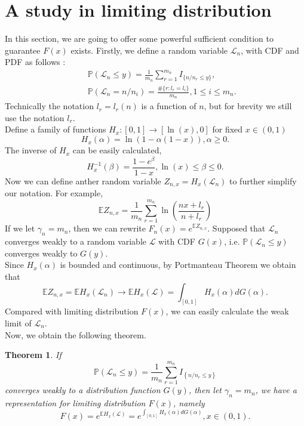 \documentclass[12pt]{article}
\theoremstyle{plain}
\newtheorem{thm}{\textbf{Theorem}}
\theoremstyle{definition}
\theoremstyle{remark}
\begin{document}
\section{A study in limiting distribution}\label{sec: a study in gamma}
In this section, we are going to offer some powerful sufficient condition to guarantee $F(x)$ exists.
Firstly, we define a random variable $\mathscr{L}_n$, with CDF and PDF as follows :
\begin{eqnarray*}
    &&\mathbb{P}(\mathscr{L}_n \leq y )=\frac{1}{m_n}\sum_{r=1}^{m_n}I_{\{n/n_r\leq y\}},\\
    &&\mathbb{P}(\mathscr{L}_n = n/n_i )=\frac{\#\{r:l_r=l_i\}}{m_n},1\leq i\leq m_n.
\end{eqnarray*}
Technically the notation $l_r=l_r(n)$ is a function of $n$, but for brevity we still use the notation $l_r$.\\
Define a family of functions $H_x:[0,1]\rightarrow[\ln (x),0]$ for fixed $x\in (0,1)$
\begin{equation*}
    H_{x}(\alpha)=\ln(1-\alpha (1-x)),\alpha \geq 0.
\end{equation*}
The inverse of $H_{x}$ can be easily calculated,
\begin{equation*}
    H^{-1}_{x}(\beta)=\dfrac{1-e^ \beta}{1-x} ,\ln(x)\leq \beta\leq0.
\end{equation*}
Now we can define anther random variable $Z_{n,x}=H_{x}(\mathscr{L}_n)$ to further simplify our notation. For example,
\begin{equation*}
    \mathbb {E}Z_{n,x}=\frac{1}{m_n} \sum_{r=1}^{m_n} \ln \left(\frac{n x+l_{r}}{n+l_{r}}\right)
\end{equation*}
If we let $\gamma_{n}=m_n$, then we can rewrite $F_n(x)=e^{\mathbb{E}Z_{n,x}}$.
Supposed that $\mathscr{L}_n$ converges weakly to a random variable $\mathscr{L}$ with CDF $G(x)$, i.e. $\mathbb{P}(\mathscr{L}_n \leq y )$ converges weakly to $G(y)$.\\
Since $H_{x}(\alpha)$ is bounded and continuous, by Portmanteau Theorem we obtain that
\begin{equation*}
    \mathbb{E}Z_{n,x}=\mathbb{E}H_{x}(\mathscr{L}_n)\to \mathbb{E}H_{x}(\mathscr{L})=\int_{[0,1]}H_{x}(\alpha)dG(\alpha).
\end{equation*}
Compared with limiting distribution $F(x)$, we can easily calculate the weak limit of $\mathscr{L}_n$.\\
Now, we obtain the following theorem.
\begin{thm}\label{thm5}
    If
    \begin{equation*}
        \mathbb{P}\left(\mathscr{L}_{n} \leqslant y\right)=\frac{1}{m_n} \sum_{r=1}^{m_n} I_{\left\{n/n_{r}  \leqslant y\right\}}
    \end{equation*}
    converges weakly to a distribution function $G(y)$, then let $\gamma_{n}=m_n$, we have a representation for limiting distribution $F(x)$, namely
    \begin{equation}\label{Def_L_n}
    F(x)=e^{\mathbb{E}H_{x}(\mathscr{L})}=e^{\int_{[0,1]}H_x(\alpha)dG(\alpha)},x\in (0,1).
    \end{equation}
\end{thm}
\end{document}
